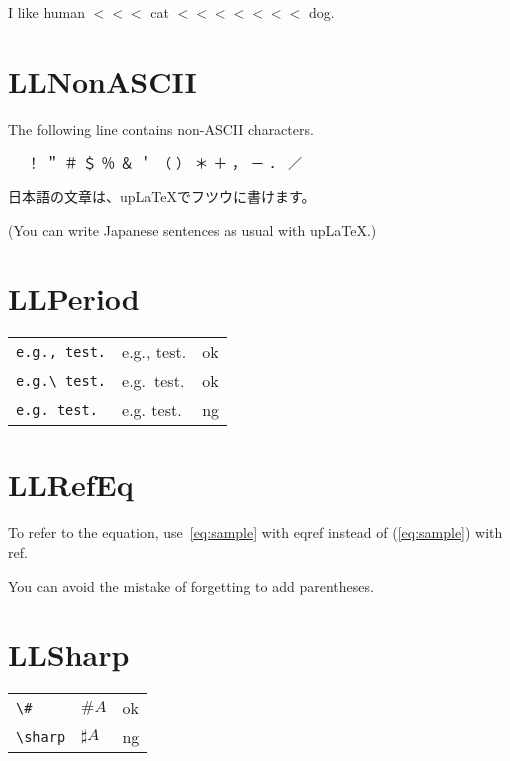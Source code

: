 \documentclass[a4paper]{article}
\newcommand{\tA}[1]{\textcolor{cA}{#1}}
\newcommand{\tD}[1]{\textcolor{cD}{#1}}
\begin{document}
I like human $<<<$ cat $<<<<<<<$ dog.

\section{LLNonASCII}

The following line contains non-ASCII characters.

\begin{CJK}{UTF8}{ipxm}{　} ！ ＂ ＃ ＄ ％ ＆ ＇ （ ） ＊ ＋ ， － ． ／\end{CJK}

\vspace{\baselineskip}

\begin{CJK}{UTF8}{ipxm}日本語の文章は、upLaTeXでフツウに書けます。\end{CJK}

(You can write Japanese sentences as usual with upLaTeX.)

\section{LLPeriod}

\begin{table}[H]
	\centering
	\begin{tabular}{lll}
		\verb|e.g., test.| & e.g., test. & \tA{ok} \\
		\verb|e.g.\ test.| & e.g.\ test. & \tA{ok} \\
		\verb|e.g. test.|  & e.g. test.  & \tD{ng} \\
	\end{tabular}
\end{table}

\section{LLRefEq}

To refer to the equation, use~\eqref{eq:sample} with eqref instead of (\ref{eq:sample}) with ref.

You can avoid the mistake of forgetting to add parentheses.

\section{LLSharp}

\begin{table}[H]
	\centering
	\begin{tabular}{lll}
		\verb|\#|     & $\#A$      & \tA{ok} \\
		\verb|\sharp| & $\sharp A$ & \tD{ng}
	\end{tabular}
\end{table}
\end{document}

